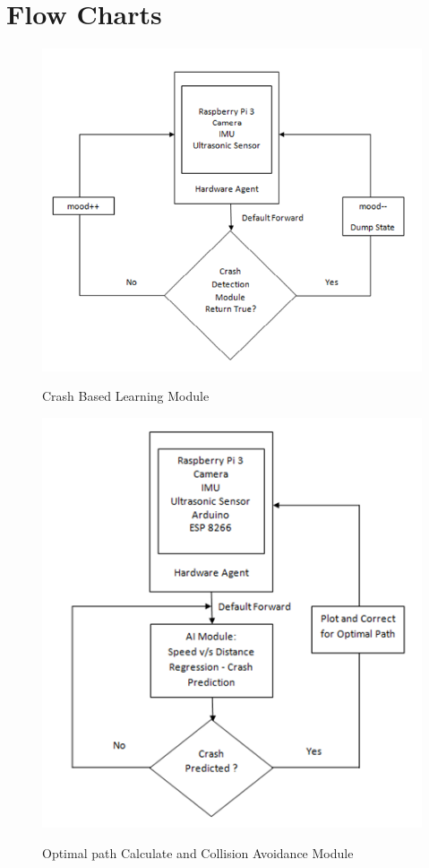 \section{Flow Charts} \label{sec:flowcharts}

\vfill
\begin{figure} [!h]
	\centering
	\caption{Crash Based Learning Module}
		\includegraphics{flow_1.png}
	\label{fig:flow 1}
\end{figure}
\vfill

\newpage

\vfill
\begin{figure} [!h]
	\centering
	\caption{Optimal path Calculate and Collision Avoidance Module}
		\includegraphics{flow_2.png}
	\label{fig:flow 2}
\end{figure}
\vfill


